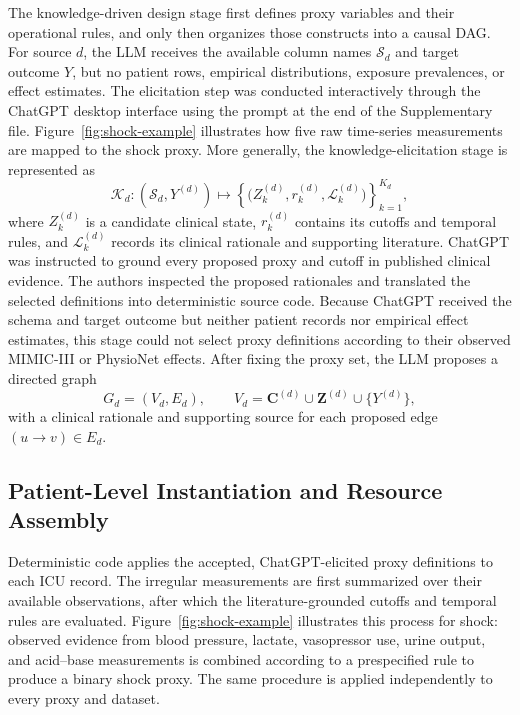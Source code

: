 \documentclass[letterpaper]{article}
\begin{document}
The knowledge-driven design stage first defines proxy variables and their
operational rules, and only then organizes those constructs into a causal DAG.
For source \(d\), the LLM receives the available column names
\(\mathcal{S}_d\) and target outcome \(Y\), but no patient rows, empirical
distributions, exposure prevalences, or effect estimates. The elicitation step was conducted interactively through the ChatGPT desktop
interface using the prompt at the end of the 
Supplementary file. Figure~\ref{fig:shock-example} illustrates how five raw
time-series measurements are mapped to the shock proxy. More generally, the
knowledge-elicitation stage is represented as
\[
\mathcal{K}_d:
(\mathcal{S}_d,Y^{(d)})
\longmapsto
\left\{
  \bigl(Z_k^{(d)},r_k^{(d)},\mathcal{L}_k^{(d)}\bigr)
\right\}_{k=1}^{K_d},
\]
where \(Z_k^{(d)}\) is a candidate clinical state, \(r_k^{(d)}\) contains its
cutoffs and temporal rules, and \(\mathcal{L}_k^{(d)}\) records its clinical
rationale and supporting literature. ChatGPT was instructed to ground every
proposed proxy and cutoff in published clinical evidence. The authors inspected
the proposed rationales and translated the selected definitions into
deterministic source code. Because ChatGPT received the schema and target
outcome but neither patient records nor empirical effect estimates, this stage
could not select proxy definitions according to their observed MIMIC-III or
PhysioNet effects.
After fixing the proxy set, the LLM proposes a directed graph
\[
G_d=(V_d,E_d),\qquad
V_d=\mathbf{C}^{(d)}\cup\mathbf{Z}^{(d)}\cup\{Y^{(d)}\},
\]
with a clinical rationale and supporting source for each proposed edge
\((u\!\rightarrow\!v)\in E_d\). 


\subsection{Patient-Level Instantiation and Resource Assembly}

Deterministic code applies the accepted, ChatGPT-elicited proxy definitions to
each ICU record. The irregular measurements are first summarized over their
available observations, after which the literature-grounded cutoffs and
temporal rules are evaluated. Figure~\ref{fig:shock-example} illustrates this
process for shock: observed evidence from blood pressure, lactate, vasopressor
use, urine output, and acid--base measurements is combined according to a
prespecified rule to produce a binary shock proxy. The same procedure is
applied independently to every proxy and dataset.
\end{document}

